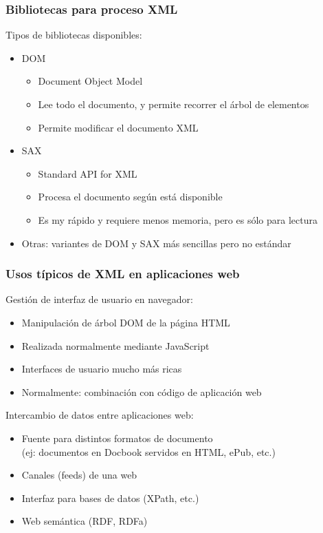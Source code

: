 
\begin{frame}
\frametitle{Bibliotecas para proceso XML}

Tipos de bibliotecas disponibles:

\begin{itemize}
\item DOM
  \begin{itemize}
  \item Document Object Model
  \item Lee todo el documento, y permite recorrer el árbol de
    elementos
  \item Permite modificar el documento XML
  \end{itemize}
\item SAX
  \begin{itemize}
  \item Standard API for XML
  \item Procesa el documento según está disponible
  \item Es my rápido y requiere menos memoria, pero es sólo para lectura
  \end{itemize}
\item Otras: variantes de DOM y SAX más sencillas pero no estándar
\end{itemize}

\end{frame}


\begin{frame}
\frametitle{Usos típicos de XML en aplicaciones web}

Gestión de interfaz de usuario en navegador:

\begin{itemize}
\item Manipulación de árbol DOM de la página HTML
\item Realizada normalmente mediante JavaScript
\item Interfaces de usuario mucho más ricas
\item Normalmente: combinación con código de aplicación web
\end{itemize}

Intercambio de datos entre aplicaciones web:

\begin{itemize}
\item Fuente para distintos formatos de documento \\
  (ej: documentos en Docbook servidos en HTML, ePub, etc.)
\item Canales (feeds) de una web
\item Interfaz para bases de datos (XPath, etc.)
\item Web semántica (RDF, RDFa)
\end{itemize}
\end{frame}


